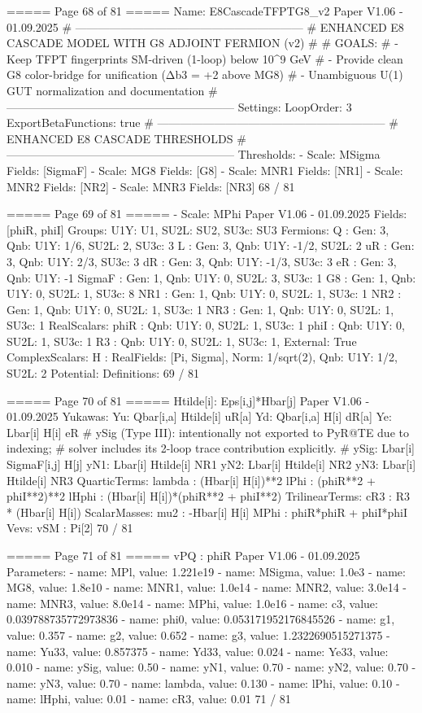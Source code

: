 \begin{MyVerbatim}
{{===== Page 68 of 81 =====
Name: E8CascadeTFPTG8_v2
Paper V1.06 - 01.09.2025
# ------------------------------------------------------------
# ENHANCED E8 CASCADE MODEL WITH G8 ADJOINT FERMION (v2)
#
# GOALS:
# - Keep TFPT fingerprints SM-driven (1-loop) below 10^9 GeV
# - Provide clean G8 color-bridge for unification (Δb3 = +2 above MG8)
# - Unambiguous U(1) GUT normalization and documentation
# ------------------------------------------------------------
Settings:
LoopOrder: 3
ExportBetaFunctions: true
# ------------------------------------------------------------
# ENHANCED E8 CASCADE THRESHOLDS
# ------------------------------------------------------------
Thresholds:
- Scale: MSigma
Fields: [SigmaF]
- Scale: MG8
Fields: [G8]
- Scale: MNR1
Fields: [NR1]
- Scale: MNR2
Fields: [NR2]
- Scale: MNR3
Fields: [NR3]
68 / 81

===== Page 69 of 81 =====
- Scale: MPhi
Paper V1.06 - 01.09.2025
Fields: [phiR, phiI]
Groups: {U1Y: U1, SU2L: SU2, SU3c: SU3}
Fermions:
Q : {Gen: 3, Qnb: {U1Y: 1/6, SU2L: 2, SU3c: 3}}
L : {Gen: 3, Qnb: {U1Y: -1/2, SU2L: 2}}
uR : {Gen: 3, Qnb: {U1Y: 2/3, SU3c: 3}}
dR : {Gen: 3, Qnb: {U1Y: -1/3, SU3c: 3}}
eR : {Gen: 3, Qnb: {U1Y: -1}}
SigmaF : {Gen: 1, Qnb: {U1Y: 0, SU2L: 3, SU3c: 1}}
G8 : {Gen: 1, Qnb: {U1Y: 0, SU2L: 1, SU3c: 8}}
NR1 : {Gen: 1, Qnb: {U1Y: 0, SU2L: 1, SU3c: 1}}
NR2 : {Gen: 1, Qnb: {U1Y: 0, SU2L: 1, SU3c: 1}}
NR3 : {Gen: 1, Qnb: {U1Y: 0, SU2L: 1, SU3c: 1}}
RealScalars:
phiR : {Qnb: {U1Y: 0, SU2L: 1, SU3c: 1}}
phiI : {Qnb: {U1Y: 0, SU2L: 1, SU3c: 1}}
R3 : {Qnb: {U1Y: 0, SU2L: 1, SU3c: 1}, External: True}
ComplexScalars:
H : {RealFields: [Pi, Sigma], Norm: 1/sqrt(2), Qnb: {U1Y: 1/2, SU2L: 2}}
Potential:
Definitions:
69 / 81

===== Page 70 of 81 =====
Htilde[i]: Eps[i,j]*Hbar[j]
Paper V1.06 - 01.09.2025
Yukawas:
Yu: Qbar[i,a] Htilde[i] uR[a]
Yd: Qbar[i,a] H[i] dR[a]
Ye: Lbar[i] H[i] eR
# ySig (Type III): intentionally not exported to PyR@TE due to indexing;
# solver includes its 2-loop trace contribution explicitly.
# ySig: Lbar[i] SigmaF[i,j] H[j]
yN1: Lbar[i] Htilde[i] NR1
yN2: Lbar[i] Htilde[i] NR2
yN3: Lbar[i] Htilde[i] NR3
QuarticTerms:
lambda : (Hbar[i] H[i])**2
lPhi : (phiR**2 + phiI**2)**2
lHphi : (Hbar[i] H[i])*(phiR**2 + phiI**2)
TrilinearTerms:
cR3 : R3 * (Hbar[i] H[i])
ScalarMasses:
mu2 : -Hbar[i] H[i]
MPhi : phiR*phiR + phiI*phiI
Vevs:
vSM : Pi[2]
70 / 81

===== Page 71 of 81 =====
vPQ : phiR
Paper V1.06 - 01.09.2025
Parameters:
- {name: MPl, value: 1.221e19}
- {name: MSigma, value: 1.0e3}
- {name: MG8, value: 1.8e10}
- {name: MNR1, value: 1.0e14}
- {name: MNR2, value: 3.0e14}
- {name: MNR3, value: 8.0e14}
- {name: MPhi, value: 1.0e16}
- {name: c3, value: 0.039788735772973836}
- {name: phi0, value: 0.053171952176845526}
- {name: g1, value: 0.357}
- {name: g2, value: 0.652}
- {name: g3, value: 1.2322690515271375}
- {name: Yu33, value: 0.857375}
- {name: Yd33, value: 0.024}
- {name: Ye33, value: 0.010}
- {name: ySig, value: 0.50}
- {name: yN1, value: 0.70}
- {name: yN2, value: 0.70}
- {name: yN3, value: 0.70}
- {name: lambda, value: 0.130}
- {name: lPhi, value: 0.10}
- {name: lHphi, value: 0.01}
- {name: cR3, value: 0.01}
71 / 81

}}
\end{MyVerbatim}
